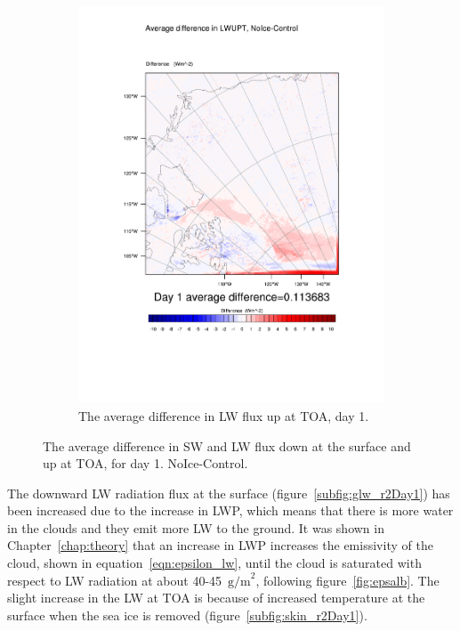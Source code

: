 \begin{figure}
\begin{subfigure}{0.48\textwidth}
		\includegraphics[width=\textwidth]{results/noice/diff_NoIce_LWUPT_Day1.pdf}
		\caption{The average difference in LW flux up at TOA, day 1.}
		\label{subfig:lwup_r2Day1}
	\end{subfigure}
	\caption{The average difference in SW and LW flux down at the surface and up at TOA, for day 1. NoIce-Control.}
	\label{fig:radiation_r2Day1}
\end{figure}

The downward LW radiation flux at the surface (figure~\ref{subfig:glw_r2Day1}) has been increased due to the increase in LWP, which means that there is more water in the clouds and they emit more LW to the ground. It was shown in Chapter~\ref{chap:theory} that an increase in LWP increases the emissivity of the cloud, shown in equation~\ref{eqn:epsilon_lw}, until the cloud is saturated with respect to LW radiation at about 40-45~$\text{g/m}^2$, following figure~\ref{fig:epsalb}.
The slight increase in the LW at TOA is because of increased temperature at the surface when the sea ice is removed (figure~\ref{subfig:skin_r2Day1}).

